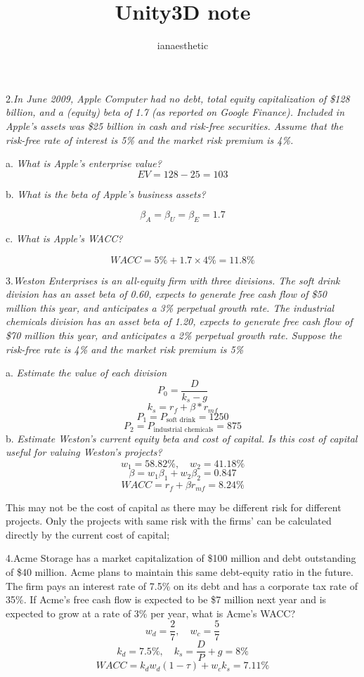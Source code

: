 \documentclass[10pt, a4paper]{article}
\author{ianaesthetic}
\title{Unity3D note}
\begin{document}
2.\emph{In June 2009, Apple Computer had no debt, total equity capitalization of \$128 billion, and a (equity) beta of 1.7 (as reported on Google Finance). Included in Apple’s assets was \$25 billion in cash and risk-free securities. Assume that the risk-free rate of interest is 5\% and the market risk premium is 4\%.}

a. \emph{What is Apple’s enterprise value?}
    $$EV = 128 - 25 = 103$$

b. \emph{What is the beta of Apple’s business assets?}

    $$\beta_A = \beta_U = \beta_E = 1.7$$

c. \emph{What is Apple’s WACC?}

    $$WACC = 5\% + 1.7 \times 4\% = 11.8\%$$

\medskip
\medskip

3.\emph{Weston Enterprises is an all-equity firm with three divisions. The soft drink division has an asset beta of 0.60, expects to generate free cash flow of \$50 million this year, and anticipates a 3\% perpetual growth rate. The industrial chemicals division has an asset beta of 1.20, expects to generate free cash flow of \$70 million this year, and anticipates a 2\% perpetual growth rate. Suppose the risk-free rate is 4\% and the market risk premium is 5\%}

a.	\emph{Estimate the value of each division}
    $$P_0 = \frac{D}{k_s - g}$$
    $$k_s = r_f + \beta * r_{mf}$$
    $$P_1 = P_{\text{soft drink}} = 1250$$
    $$P_2 = P_{\text{industrial chemicals}} = 875$$
b.	\emph{Estimate Weston’s current equity beta and cost of capital. Is this cost of capital useful for valuing Weston’s projects?}
    $$w_{1} = 58.82\%, \quad w_{2} = 41.18\%$$
    $$\beta = w_1\beta_1 + w_2\beta_2 = 0.847$$
    $$WACC = r_f + \beta r_{mf} = 8.24\%$$

    This may not be the cost of capital as there may be different risk for different projects. Only the projects with same risk with the firms' can be calculated directly by the current cost of capital; 

\medskip
\medskip

\newpage

4.Acme Storage has a market capitalization of \$100 million and debt outstanding of \$40 million. Acme plans to maintain this same debt-equity ratio in the future. The firm pays an interest rate of 7.5\% on its debt and has a corporate tax rate of 35\%. If Acme’s free cash flow is expected to be \$7 million next year and is expected to grow at a rate of 3\% per year, what is Acme’s WACC?
$$w_d = \frac{2}{7},\quad w_c = \frac{5}{7}$$
$$k_d = 7.5\%,\quad k_s = \frac{D}{P} + g = 8\%$$
$$WACC = k_dw_d(1 - \tau) + w_ck_s = 7.11\%$$
\end{document}
